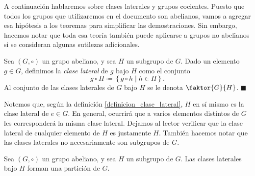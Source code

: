 A continuación hablaremos sobre clases laterales y grupos cocientes. Puesto que todos los grupos que utilizaremos en el documento son abelianos, vamos a agregar esa hipótesis a los teoremas para simplificar las demostraciones. Sin embargo, hacemos notar que toda esa teoría también puede aplicarse a grupos no abelianos si se consideran algunas sutilezas adicionales. 

\begin{definition} \label{definicion_clase_lateral}
Sea $(G, \circ)$ un grupo abeliano, y sea $H$ un subgrupo de $G$. Dado un elemento $g \in G$, definimos la \emph{clase lateral} de $g$ bajo $H$ como el conjunto
$$g \circ H \coloneq \left\{ g \circ h \mid h \in H \right\}.$$ Al conjunto de las clases laterales de $G$ bajo $H$ se le denota $\faktor{G}{H}$.
\hfill$\blacksquare$
\end{definition}

Notemos que, según la definición \ref{definicion_clase_lateral}, $H$ en sí mismo es la clase lateral de $e \in G$. En general, ocurrirá que a varios elementos distintos de $G$ les corresponderá la misma clase lateral. Dejamos al lector verificar que la clase lateral de cualquier elemento de $H$ es justamente $H$. También hacemos notar que las clases laterales no necesariamente son subgrupos de $G$.

\begin{prop} \label{lema:rel bin}
Sea $(G, \circ)$ un grupo abeliano, y sea $H$ un subgrupo de $G$. Las clases laterales bajo $H$ forman una partición de $G$.
\end{prop}

